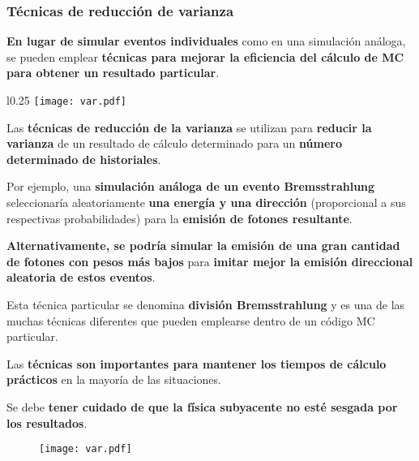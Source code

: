 \documentclass[aspectratio=169,xcolor=dvipsnames,t]{beamer}
\begin{document}
\begin{frame}

    \frametitle{Técnicas de reducción de varianza}

    \textbf{ En lugar de simular eventos individuales} como en una simulación análoga, se pueden emplear \textbf{técnicas para mejorar la eficiencia del cálculo de MC para obtener un resultado particular}.

    \begin{wrapfigure}{l}{0.25\textwidth}
        \centering
        \texttt{[image: var.pdf]}
    \end{wrapfigure}

    Las \textbf{técnicas de reducción de la varianza} se utilizan para \textbf{reducir la varianza} de un resultado de cálculo determinado para un \textbf{número determinado de historiales}.

    Por ejemplo, una \textbf{simulación análoga de un evento Bremsstrahlung} seleccionaría aleatoriamente \textbf{una energía y una dirección} (proporcional a sus respectivas probabilidades) para la \textbf{emisión de fotones resultante}. 
    
    \textbf{Alternativamente, se podría simular la emisión de una gran cantidad de fotones con pesos más bajos} para \textbf{imitar mejor la emisión direccional aleatoria de estos eventos}.

\end{frame}

\begin{frame}

    Esta técnica particular se denomina \textbf{división Bremsstrahlung} y es una de las muchas técnicas diferentes que pueden emplearse dentro de un código MC particular. 
    
    Las \textbf{técnicas son importantes para mantener los tiempos de cálculo prácticos} en la mayoría de las situaciones. 

    Se debe \textbf{tener cuidado de que la física subyacente no esté sesgada por los resultados}.

    \vspace{0.2cm}

    \begin{figure}
        \centering
        \texttt{[image: var.pdf]}
    \end{figure}

\end{frame}
\end{document}
